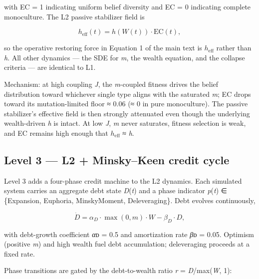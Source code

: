 \documentclass[11pt,letterpaper]{article}
\begin{document}
with EC = 1 indicating uniform belief diversity and EC = 0 indicating complete monoculture. The L2 passive stabilizer field is

\[
h_{\mathrm{eff}}(t) = h(W(t)) \cdot \mathrm{EC}(t),
\]

so the operative restoring force in Equation 1 of the main text is \(h_{\mathrm{eff}}\) rather than \emph{h}. All other dynamics --- the SDE for \emph{m}, the wealth equation, and the collapse criteria --- are identical to L1.

Mechanism: at high coupling \emph{J}, the \emph{m}-coupled fitness drives the belief distribution toward whichever single type aligns with the saturated \emph{m}; EC drops toward its mutation-limited floor ≈ 0.06 (≈ 0 in pure monoculture). The passive stabilizer's effective field is then strongly attenuated even though the underlying wealth-driven \emph{h} is intact. At low \emph{J}, \emph{m} never saturates, fitness selection is weak, and EC remains high enough that \(h_{\mathrm{eff}}\) ≈ \emph{h}.

\subsection{Level 3 --- L2 + Minsky--Keen credit cycle}\label{level-3-l2-minskykeen-credit-cycle}

Level 3 adds a four-phase credit machine to the L2 dynamics. Each simulated system carries an aggregate debt state \emph{D}(\emph{t}) and a phase indicator \emph{p}(\emph{t}) ∈ \{Expansion, Euphoria, MinskyMoment, Deleveraging\}. Debt evolves continuously,

\[
\dot D = \alpha_D \cdot \max(0, m) \cdot W - \beta_D \cdot D,
\]

with debt-growth coefficient \emph{α}ᴅ = 0.5 and amortization rate \emph{β}ᴅ = 0.05. Optimism (positive \emph{m}) and high wealth fuel debt accumulation; deleveraging proceeds at a fixed rate.

Phase transitions are gated by the debt-to-wealth ratio \emph{r} = \emph{D}/max(\emph{W}, 1):
\end{document}

